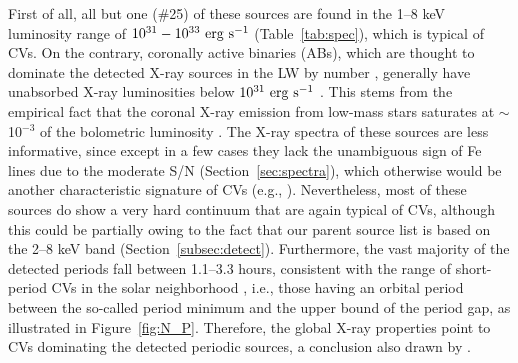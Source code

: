 \documentclass[fleqn,usenatbib]{mnras}
\begin{document}
First of all, all but one (\#25) of these sources are found in the 1--8 keV luminosity range of $10^{31}-10^{33}\rm~erg~s^{-1}$ (Table~\ref{tab:spec}), which is typical of CVs. 
On the contrary, coronally active binaries (ABs), which are thought to dominate the detected X-ray sources in the LW by number \citep{2009Natur.458.1142R}, generally have unabsorbed X-ray luminosities below $\rm 10^{31}~erg~s^{-1}$ \citep{2006A&A...450..117S}. 
This stems from the empirical fact that the coronal X-ray emission from low-mass stars saturates at $\sim$10$^{-3}$ of the bolometric luminosity \citep{2004A&ARv..12...71G}.
The X-ray spectra of these sources are less informative, since except in a few cases they lack the unambiguous sign of Fe lines due to the moderate S/N (Section~\ref{sec:spectra}), which otherwise would be another characteristic signature of CVs (e.g., \citealp{2016ApJ...818..136X}).
Nevertheless, most of these sources do show a very hard continuum that are again typical of CVs, although this could be partially owing to the fact that our parent source list is based on the 2--8 keV band (Section~\ref{subsec:detect}).
Furthermore, the vast majority of the detected periods fall between 1.1--3.3 hours, consistent with the range of short-period CVs in the solar neighborhood \citep{2003A&A...404..301R}, i.e., those having an orbital period between the so-called period minimum and the upper bound of the period gap, as illustrated in Figure~\ref{fig:N_P}. 
Therefore, the global X-ray properties point to CVs dominating the detected periodic sources, a conclusion also drawn by \cite{2012ApJ...746..165H}.
\end{document}
